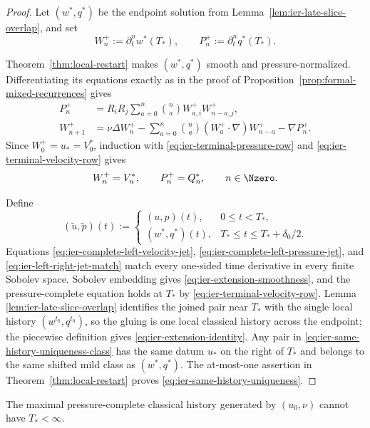 \begin{proof}
Let \((w^*,q^*)\) be the endpoint solution from
Lemma~\ref{lem:ier-late-slice-overlap}, and set
\[
 W_n^+:=\partial_t^nw^*(T_*),
 \qquad
 P_n^+:=\partial_t^nq^*(T_*).
\]
\begin{samepage}
Theorem~\ref{thm:local-restart} makes \((w^*,q^*)\) smooth and
pressure-normalized.  Differentiating its equations exactly as in the proof of
Proposition~\ref{prop:formal-mixed-recurrences} gives
\begin{align*}
 P_n^+&=R_iR_j\sum_{a=0}^{n}\binom naW_{a,i}^+W_{n-a,j}^+,\\
 W_{n+1}^+&=\nu\Delta W_n^+
 -\sum_{a=0}^{n}\binom na(W_a^+\cdot\nabla)W_{n-a}^+
 -\nabla P_n^+.
\end{align*}
Since \(W_0^+=u_*=V_0^*\), induction with
\eqref{eq:ier-terminal-pressure-row} and
\eqref{eq:ier-terminal-velocity-row} gives
\begin{equation}
 W_n^+=V_n^*,
 \qquad P_n^+=Q_n^*,
 \qquad n\in\Nzero.
 \label{eq:ier-left-right-jet-match}
\end{equation}
\par
\end{samepage}

Define
\[
 (\widetilde u,\widetilde p)(t)
 :=\begin{cases}
 (u,p)(t),&0\le t<T_*,\\
 (w^*,q^*)(t),&T_*\le t\le T_*+\delta_0/2.
 \end{cases}
\]
Equations \eqref{eq:ier-complete-left-velocity-jet},
\eqref{eq:ier-complete-left-pressure-jet}, and
\eqref{eq:ier-left-right-jet-match} match every one-sided time derivative in
every finite Sobolev space.  Sobolev embedding gives
\eqref{eq:ier-extension-smoothness}, and the pressure-complete equation holds
at \(T_*\) by \eqref{eq:ier-terminal-velocity-row}.  Lemma
\ref{lem:ier-late-slice-overlap} identifies the joined pair near \(T_*\) with
the single local history \((w^{t_0},q^{t_0})\), so the gluing is one local
classical history across the endpoint; the piecewise definition gives
\eqref{eq:ier-extension-identity}.  Any pair in
\eqref{eq:ier-same-history-uniqueness-class} has the same datum \(u_*\) on
the right of \(T_*\) and belongs to the same shifted mild class as
\((w^*,q^*)\).  The at-most-one assertion in
Theorem~\ref{thm:local-restart} proves
\eqref{eq:ier-same-history-uniqueness}.
\end{proof}

\begin{corollary}
\label{cor:ier-maximal-time-contradiction}
The maximal pressure-complete classical history generated by
\((u_0,\nu)\) cannot have \(T_*<\infty\).
\end{corollary}

